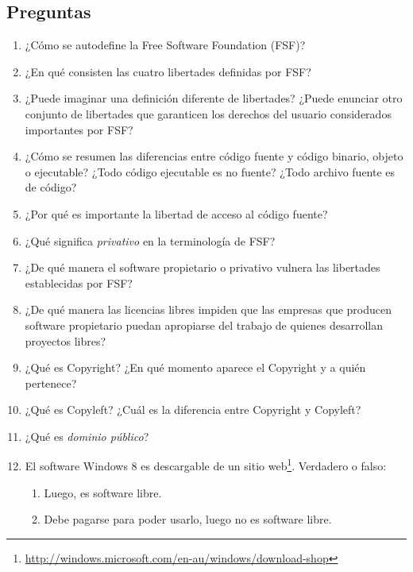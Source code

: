 \subsection{Preguntas}
\begin{enumerate}
	\item ¿Cómo se autodefine la Free Software Foundation (FSF)?
	\item ¿En qué consisten las cuatro libertades definidas por FSF?
	\item ¿Puede imaginar una definición diferente de libertades? ¿Puede enunciar otro conjunto de libertades que garanticen los derechos del usuario considerados importantes por FSF?
	\item ¿Cómo se resumen las diferencias entre código fuente y código binario, objeto o ejecutable? ¿Todo código ejecutable es no fuente? ¿Todo archivo fuente es de código?
	\item ¿Por qué es importante la libertad de acceso al código fuente?
	\item ¿Qué significa \emph{privativo} en la terminología de FSF?
	\item ¿De qué manera el software propietario o privativo vulnera las libertades establecidas por FSF?
	\item ¿De qué manera las licencias libres impiden que las empresas que producen software propietario puedan apropiarse del trabajo de quienes desarrollan proyectos libres?
	\item ¿Qué es Copyright? ¿En qué momento aparece el Copyright y a quién pertenece? 
	\item ¿Qué es Copyleft? ¿Cuál es la diferencia entre Copyright y Copyleft?
	\item ¿Qué es \emph{dominio público}? 
	\item El software Windows 8 es descargable de un sitio web\footnote{\url{http://windows.microsoft.com/en-au/windows/download-shop}}. Verdadero o falso:  
	\begin{enumerate} 
		\item Luego, es software libre.
		\item Debe pagarse para poder usarlo, luego no es software libre. 
	\end{enumerate}


\end{enumerate}
